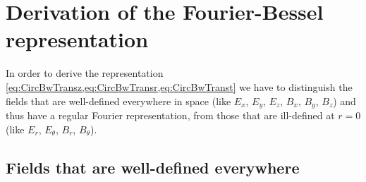 
\section{Derivation of the Fourier-Bessel representation}
\label{sec:CircTrans}

In order to derive the representation \cref{eq:CircBwTransz,eq:CircBwTransr,eq:CircBwTranst} we have to
distinguish the fields that are well-defined everywhere in space (like
$E_x$, $E_y$, $E_z$, $B_x$, $B_y$, $B_z$) and thus have a regular
Fourier representation, from those that are ill-defined at $r=0$ (like $E_r$, $E_\theta$, $B_r$, $B_\theta$).

\subsection{Fields that are well-defined everywhere}

